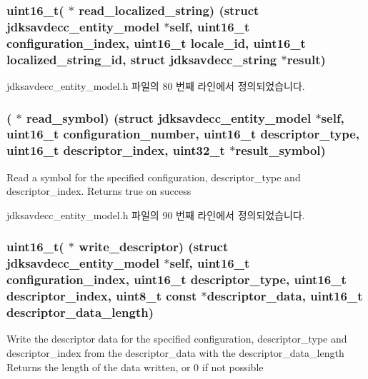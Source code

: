 \subsubsection[{\texorpdfstring{read\+\_\+localized\+\_\+string}{read_localized_string}}]{\setlength{\rightskip}{0pt plus 5cm}uint16\+\_\+t( $\ast$ read\+\_\+localized\+\_\+string) (struct {\bf jdksavdecc\+\_\+entity\+\_\+model} $\ast$self, uint16\+\_\+t configuration\+\_\+index, uint16\+\_\+t locale\+\_\+id, uint16\+\_\+t localized\+\_\+string\+\_\+id, struct {\bf jdksavdecc\+\_\+string} $\ast$result)}\hypertarget{structjdksavdecc__entity__model_ac664c9b20a918f1327572dacf86dbc5f}{}\label{structjdksavdecc__entity__model_ac664c9b20a918f1327572dacf86dbc5f}


jdksavdecc\+\_\+entity\+\_\+model.\+h 파일의 80 번째 라인에서 정의되었습니다.

\subsubsection[{\texorpdfstring{read\+\_\+symbol}{read_symbol}}]{( $\ast$ read\+\_\+symbol) (struct {\bf jdksavdecc\+\_\+entity\+\_\+model} $\ast$self, uint16\+\_\+t configuration\+\_\+number, uint16\+\_\+t descriptor\+\_\+type, uint16\+\_\+t descriptor\+\_\+index, {\bf uint32\+\_\+t} $\ast$result\+\_\+symbol)}\hypertarget{structjdksavdecc__entity__model_a6bc9b49a59ca36662aeb56bc71b9d105}{}\label{structjdksavdecc__entity__model_a6bc9b49a59ca36662aeb56bc71b9d105}
Read a symbol for the specified configuration, descriptor\+\_\+type and descriptor\+\_\+index. Returns true on success 

jdksavdecc\+\_\+entity\+\_\+model.\+h 파일의 90 번째 라인에서 정의되었습니다.

\subsubsection[{\texorpdfstring{write\+\_\+descriptor}{write_descriptor}}]{\setlength{\rightskip}{0pt plus 5cm}uint16\+\_\+t( $\ast$ write\+\_\+descriptor) (struct {\bf jdksavdecc\+\_\+entity\+\_\+model} $\ast$self, uint16\+\_\+t configuration\+\_\+index, uint16\+\_\+t descriptor\+\_\+type, uint16\+\_\+t descriptor\+\_\+index, {\bf uint8\+\_\+t} const $\ast$descriptor\+\_\+data, uint16\+\_\+t descriptor\+\_\+data\+\_\+length)}\hypertarget{structjdksavdecc__entity__model_af01cb0b5655b715f7f5081aa380b06ac}{}\label{structjdksavdecc__entity__model_af01cb0b5655b715f7f5081aa380b06ac}
Write the descriptor data for the specified configuration, descriptor\+\_\+type and descriptor\+\_\+index from the descriptor\+\_\+data with the descriptor\+\_\+data\+\_\+length Returns the length of the data written, or 0 if not possible 

